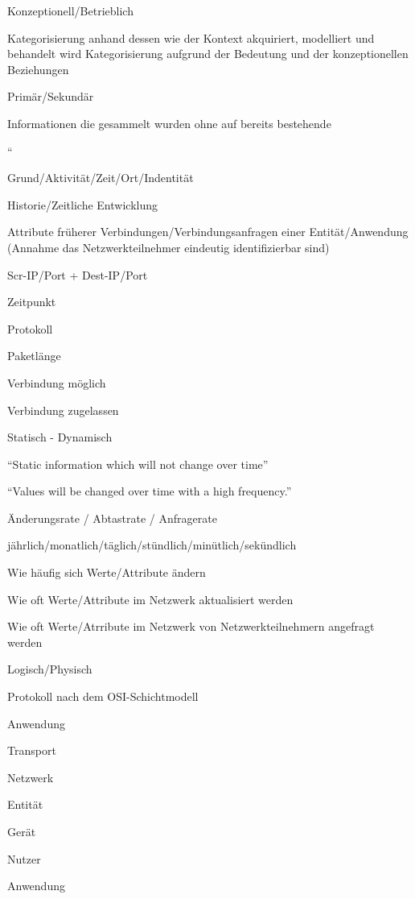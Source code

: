 Konzeptionell/Betrieblich

Kategorisierung anhand dessen wie der Kontext akquiriert, modelliert und behandelt wird
Kategorisierung aufgrund der Bedeutung und der konzeptionellen Beziehungen

Primär/Sekundär

Informationen die gesammelt wurden ohne auf bereits bestehende 

“%

Grund/Aktivität/Zeit/Ort/Indentität

Historie/Zeitliche Entwicklung

Attribute früherer Verbindungen/Verbindungsanfragen einer Entität/Anwendung (Annahme das Netzwerkteilnehmer eindeutig identifizierbar sind)

Scr-IP/Port + Dest-IP/Port

Zeitpunkt

Protokoll

Paketlänge

Verbindung möglich

Verbindung zugelassen

Statisch - Dynamisch

“Static information which will not change over time” 

“Values will be changed over time with a high frequency.” 

Änderungsrate / Abtastrate / Anfragerate

jährlich/monatlich/täglich/stündlich/minütlich/sekündlich

Wie häufig sich Werte/Attribute ändern

Wie oft Werte/Attribute im Netzwerk aktualisiert werden

Wie oft Werte/Atrribute im Netzwerk von Netzwerkteilnehmern angefragt werden

Logisch/Physisch

Protokoll nach dem OSI-Schichtmodell

Anwendung

Transport

Netzwerk

Entität

Gerät

Nutzer

Anwendung